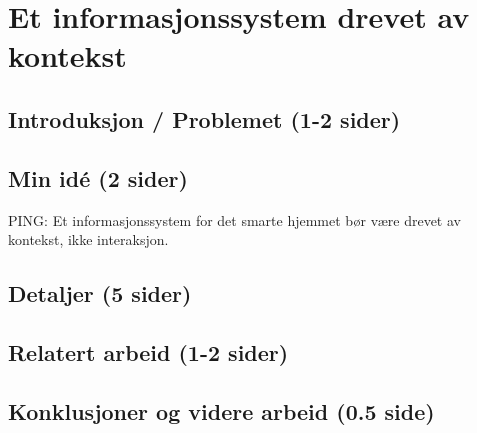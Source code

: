 \section{Et informasjonssystem drevet av kontekst}
\subsection{Introduksjon / Problemet (1-2 sider)}

\subsection{Min idé (2 sider)}
{\color{red}PING: Et informasjonssystem for det smarte hjemmet bør være drevet av kontekst, ikke interaksjon.}

\subsection{Detaljer (5 sider)}

\subsection{Relatert arbeid (1-2 sider)}

\subsection{Konklusjoner og videre arbeid (0.5 side)}

